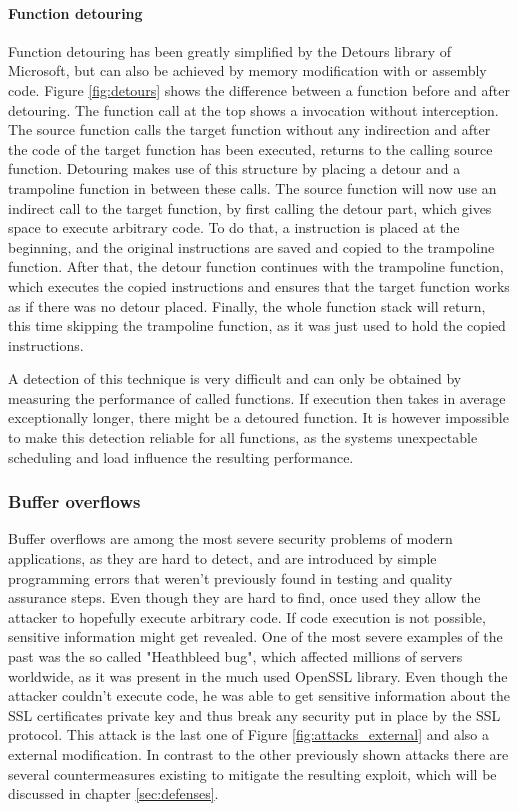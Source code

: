 \paragraph{Function detouring}

Function detouring has been greatly simplified by the Detours\cite{msdetours} library of Microsoft, but can also be achieved by memory modification with  or assembly code. Figure \ref{fig:detours} shows the difference between a function before and after detouring. The function call at the top shows a invocation without interception. The source function calls the target function without any indirection and after the code of the target function has been executed, returns to the calling source function. Detouring makes use of this structure by placing a detour and a trampoline function in between these calls. The source function will now use an indirect call to the target function, by first calling the detour part, which gives space to execute arbitrary code. To do that, a  instruction is placed at the beginning, and the original instructions are saved and copied to the trampoline function. After that, the detour function continues with the trampoline function, which executes the copied instructions and ensures that the target function works as if there was no detour placed. Finally, the whole function stack will return, this time skipping the trampoline function, as it was just used to hold the copied instructions. 

A detection of this technique is very difficult and can only be obtained by measuring the performance of called functions. If execution then takes in average exceptionally longer, there might be a detoured function. It is however impossible to make this detection reliable for all functions, as the systems unexpectable scheduling and load influence the resulting performance.

\subsubsection{Buffer overflows}
Buffer overflows are among the most severe security problems of modern applications, as they are hard to detect, and are introduced by simple programming errors that weren't previously found in testing and quality assurance steps. Even though they are hard to find, once used they allow the attacker to hopefully execute arbitrary code. If code execution is not possible, sensitive information might get revealed. One of the most severe examples of the past was the so called "Heathbleed bug", which affected millions of servers worldwide, as it was present in the much used OpenSSL library. Even though the attacker couldn't execute code, he was able to get sensitive information about the SSL certificates private key and thus break any security put in place by the SSL protocol. This attack is the last one of Figure \ref{fig:attacks_external} and also a external modification. In contrast to the other previously shown attacks there are several countermeasures existing to mitigate the resulting exploit, which will be discussed in chapter \ref{sec:defenses}.

